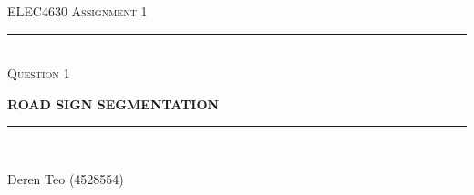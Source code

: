 \begin{titlepage}
    \centering

    \textsc{ELEC4630 Assignment 1}\\
    \vspace{9cm}

    \rule{\linewidth}{0.5pt}\\

    \vspace{1em}
    \LARGE\textsc{Question 1}\\
    \vspace{1em}

    \LARGE\uppercase{\textbf{{Road Sign Segmentation}}}\\

    \rule{\linewidth}{2pt}\\

    \vfill

    \normalsize{Deren Teo (4528554)}
    \vspace{1cm}

\end{titlepage}

